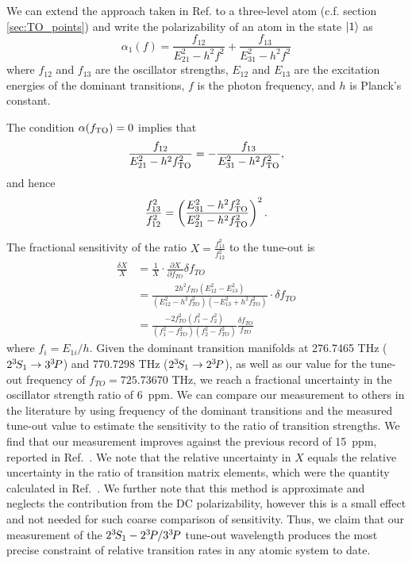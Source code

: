 	We can extend the approach taken in Ref. \cite{Mitroy13} to a three-level atom (c.f. section \ref{sec:TO_points}) and write the polarizability of an atom in the state $|1\rangle$ as 
	\begin{equation}
	\alpha_1(f) = \frac{f_{12}}{E_{21}^2-h^2 f^2}+\frac{f_{13}}{E_{31}^2-h^2 f^2}
	\end{equation}
	where $f_{12}$ and $f_{13}$ are the oscillator strengths, $E_{12}$ and $E_{13}$ are the excitation energies of the dominant transitions, $f$ is the photon frequency, and \(h\) is Planck's constant. 

	The condition $\alpha(f_\mathrm{TO})=0$ implies that
	\begin{equation}
		 \frac{f_{12}}{E_{21}^2-h^2 f_\mathrm{TO}^2} = -\frac{f_{13}}{E_{31}^2-h^2 f_\mathrm{TO}^2},
	\end{equation}
	and hence
	\begin{equation}
		\frac{f_{13}^2}{f_{12}^2} = \left(\frac{E_{31}^2-h^2 f_\mathrm{TO}^2}{E_{21}^2-h^2 f_\mathrm{TO}^2}\right)^2.
	\end{equation}

	The fractional sensitivity of the ratio $X=\frac{f_{13}^2}{f_{12}^2}$ to the tune-out is
	\begin{align}
	    \frac{\delta X}{X} &= \frac{1}{X} \cdot  \frac{\partial X} {\partial f_{TO}} \delta f_{TO} \\
				    &=\frac{2  h^2 f_{TO} (E_{12}^2-E_{13}^2)}{(E_{12}^2-h^2 f_{TO}^2) (-E_{13}^2 + h^2 f_{TO}^2 )} \cdot \delta  f_{TO}\\
				    & = \frac{-2 f_{TO}^2 (f_1^2-f_2^2)}{(f_1^2-f_{TO}^2)(f_2^2-f_{TO}^2)} \frac{\delta  f_{TO}}{f_{TO}}
	\end{align}
	where $f_i=E_{1i}/h$.
	Given the dominant transition manifolds at 276.7465 THz (\(2^{3\!}S_1 \to 3^{3\!}P \)) and 770.7298 THz (\(2^{3\!}S_1 \to 2^{3\!}P\)), as well as our value for the tune-out frequency of \(f_{TO}=725.73670\) THz, we reach a fractional uncertainty in the oscillator strength ratio of 6~ppm.
	We can compare our measurement to others in the literature by using frequency of the dominant transitions and the measured tune-out value to estimate the sensitivity to the ratio of transition strengths. 
	We find that our measurement improves against the previous record of 15~ppm, reported in Ref.~\cite{Leonard15}. 
	We note that the relative uncertainty in $X$ equals the relative uncertainty in the ratio of transition matrix elements, which were the quantity calculated in Ref.~\cite{Leonard15}.
	We further note that this method is approximate and neglects the contribution from the DC polarizability, however this is a small effect and not needed for such coarse comparison of sensitivity. 
	Thus, we claim that our measurement of the $2^{3\!}S_1- 2^{3\!}P / 3^{3\!}P$ tune-out wavelength produces the most precise constraint of relative transition rates in any atomic system to date. 


